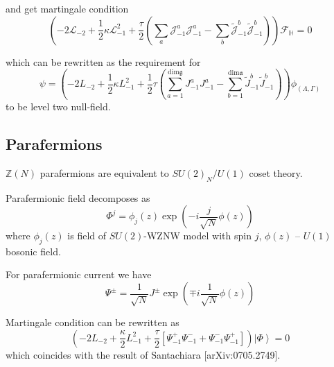 \documentclass[12pt]{article}
\theoremstyle{definition}
\newcommand{\gf}{\mathfrak{g}}
\newcommand{\af}{\mathfrak{a}}
\theoremstyle{definition} \newtheorem{Def}{Definition}
\begin{document}
and get martingale condition
\begin{equation*}
  \left(-2 \mathcal{L}_{-2}+\frac{1}{2}\kappa \mathcal{L}_{-1}^{2}+\frac{\tau}{2}\left( \sum_{a} \mathcal{J}^{a}_{-1} \mathcal{J}^{a}_{-1}-
      \sum_{b}\tilde{\mathcal{J}}^{b}_{-1} \tilde{\mathcal{J}}^{b}_{-1}\right)\right)        \mathcal{F}_{\mathbb{H}}=0
\end{equation*}

which can be rewritten as the requirement for
\begin{equation*}
  \psi=\left(-2L_{-2}+\frac{1}{2}\kappa L_{-1}^{2}+\frac{1}{2}\tau \left(\sum_{a=1}^{\mathrm{dim}\gf}J^{a}_{-1}J^{a}_{-1}-\sum_{b=1}^{\mathrm{dim}\af}\tilde{J}^{b}_{-1}\tilde{J}^{b}_{-1}\right)\right) \phi_{(\Lambda,\Gamma)}
\end{equation*}
to be level two null-field.





\subsection{Parafermions}
$\mathbb{Z}(N)$ parafermions are equivalent to $SU(2)_{N}/U(1)$ coset theory.

Parafermionic field decomposes as
\begin{equation*}
  \Phi^{j}=\phi_{j}(z) \exp\left( -i \frac{j}{\sqrt{N}}\phi(z)\right)
\end{equation*}
where $\phi_{j}(z)$ is field of $SU(2)$-WZNW model with spin $j$, $\phi(z)$ -- $U(1)$ bosonic field.

For parafermionic current we have
\begin{equation*}
  \Psi^{\pm}=\frac{1}{\sqrt{N}} J^{\pm}\exp\left(\mp i \frac{1}{\sqrt{N}}\phi(z)\right)
\end{equation*}

Martingale condition can be rewritten as
\begin{equation*}
  \left(-2 L_{-2}+\frac{\kappa}{2}L_{-1}^{2}+\frac{\tau}{2}\left[\Psi^{+}_{-1}\Psi^{-}_{-1}+\Psi^{-}_{-1}\Psi^{+}_{-1}\right]\right) \left|\Phi\right>=0
\end{equation*}
which coincides with the result of Santachiara [arXiv:0705.2749].
\end{document}
